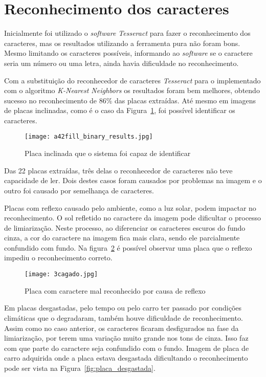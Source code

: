 \section{Reconhecimento dos caracteres}
\label{sec:reconhecimento_dos_caracteres_resultados}

Inicialmente foi utilizado o \emph{software Tesseract} para fazer o
reconhecimento dos caracteres, mas os resultados utilizando a ferramenta pura
não foram bons. Mesmo limitando os caracteres possíveis, informando ao
\emph{software} se o caractere seria um número ou uma letra, ainda havia
dificuldade no reconhecimento.

Com a substituição do reconhecedor de caracteres \emph{Tesseract} para o
implementado com o algoritmo \emph{K-Nearest Neighbors} os resultados foram bem
melhores, obtendo sucesso no reconhecimento de 86\% das placas extraídas. Até
mesmo em imagens de placas inclinadas, como é o caso da
Figura~\ref{fig:plate_torta_result}, foi possível identificar os caracteres.

\begin{figure}[H]
	\centering
	\texttt{[image: a42fill\_binary\_results.jpg]}
	\caption{Placa inclinada que o sistema foi capaz de identificar}
	\label{fig:plate_torta_result}
\end{figure}

Das 22 placas extraídas, três delas o reconhecedor de caracteres não teve
capacidade de ler. Dois destes casos foram causados por problemas na imagem e o outro
foi causado por semelhança de caracteres.

Placas com reflexo causado pelo ambiente, como a luz solar, podem impactar no
reconhecimento. O sol refletido no caractere da imagem pode dificultar o
processo de limiarização. Neste processo, ao diferenciar os caracteres escuros
do fundo cinza, a cor do caractere na imagem fica mais clara, sendo ele
parcialmente confundido com fundo. Na figura~\ref{fig:cagado_reflexo} é possível
observar uma placa que o reflexo impediu o reconhecimento correto.

\begin{figure}[H]
	\centering
	\texttt{[image: 3cagado.jpg]}
	\caption{Placa com caractere mal reconhecido por causa de reflexo}
	\label{fig:cagado_reflexo}
\end{figure}

Em placas desgastadas, pelo tempo ou pelo carro ter passado por condições climáticas que o degradaram, também houve dificuldade de reconhecimento. Assim como no caso anterior, os caracteres ficaram desfigurados na fase da limiarização, por terem uma variação muito grande nos tons de cinza. Isso faz com que parte do caractere seja confundido com o fundo. Imagem de placa de carro adquirida onde a placa estava desgastada dificultando o reconhecimento pode ser vista na Figura~\ref{fig:placa_desgastada}.

